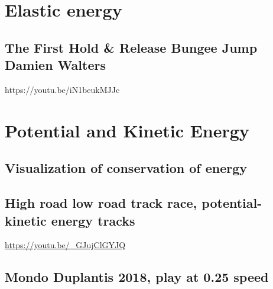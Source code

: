 \documentclass[
  letterpaper,
  DIV=11,
  numbers=noendperiod]{scrreprt}
\begin{document}

\section*{Elastic energy}\label{elastic-energy}


\subsection*{The First Hold \& Release Bungee Jump \textbar{} Damien
Walters}\label{the-first-hold-release-bungee-jump-damien-walters}

https://youtu.be/iN1beukMJJc

\section*{Potential and Kinetic
Energy}\label{potential-and-kinetic-energy}


\subsection*{Visualization of conservation of
energy}\label{visualization-of-conservation-of-energy}

\subsection*{High road low road track race, potential-kinetic energy
tracks}\label{high-road-low-road-track-race-potential-kinetic-energy-tracks}

\url{https://youtu.be/_GJujClGYJQ}

\subsection*{Mondo Duplantis 2018, play at 0.25
speed}\label{mondo-duplantis-2018-play-at-0.25-speed}
\end{document}
